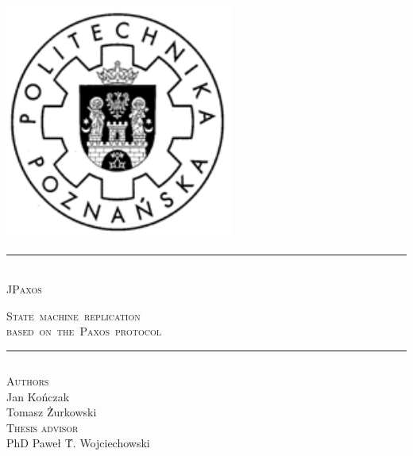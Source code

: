 \documentclass[hyperref={pdfpagelabels=true},11pt,compress,trans]{beamer}
\begin{document}
{ %

  \logo
  {
    \includegraphics[keepaspectratio,height=0.2\textheight]{images/put_logo.pdf} \hspace*{3.5em}
  }

  \begin{frame}
    \rmfamily
    \begin{center}
      \Huge
        \par\noindent\ignorespaces\rule{0.8\textwidth}{0.05em} \\
        \textsc{JPaxos}

        \vspace*{-\parsep}
        \begin{minipage}{0.5\textwidth}
          \normalsize\centering
          \textsc{State~machine~replication\\based~on~the~Paxos~protocol}
        \end{minipage}

        \rule{0.8\textwidth}{0.05em}
      \tiny

      \vspace{1em}

      \begin{columns}
        \begin{tabbing}
          \textsc{Authors} \qquad \= \\
          \>Jan \' Kończak \\
          \>Tomasz \' Żurkowski \\
          \textsc{Thesis advisor} \\
          \> PhD Paweł \' T. Wojciechowski
        \end{tabbing}
      \end{columns}
    \end{center}
  \end{frame}
}
\end{document}
